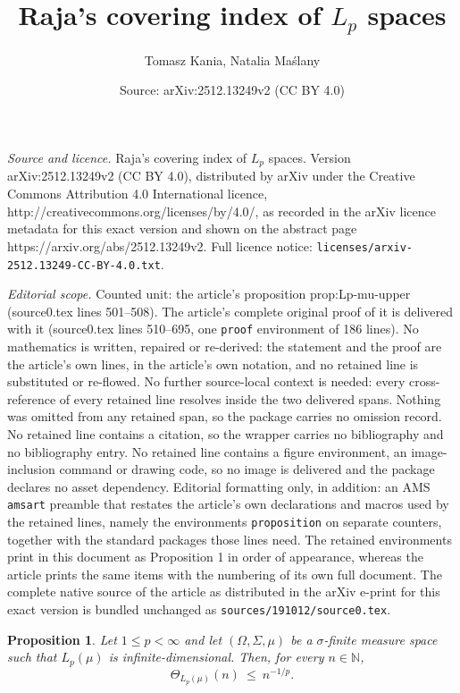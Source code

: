 \documentclass[10pt,a4paper]{amsart}
\title{Raja's covering index of $L_p$ spaces}
\author{Tomasz Kania, Natalia Ma\'slany}
\date{Source: arXiv:2512.13249v2 (CC BY 4.0)}
\newtheorem{proposition}{Proposition}
\renewcommand{\le}{\leqslant}
\begin{document}
\maketitle

\noindent\emph{Source and licence.} Raja's covering index of $L_p$ spaces. Version arXiv:2512.13249v2 (CC BY 4.0), distributed by arXiv under the Creative Commons Attribution 4.0 International licence, http://creativecommons.org/licenses/by/4.0/, as recorded in the arXiv licence metadata for this exact version and shown on the abstract page https://arxiv.org/abs/2512.13249v2. Full licence notice: \texttt{licenses/arxiv-2512.13249-CC-BY-4.0.txt}.\par\smallskip

\noindent\textit{Editorial scope.} Counted unit: the article's proposition prop:Lp-mu-upper (source0.tex lines 501--508). The article's complete original proof of it is delivered with it (source0.tex lines 510--695, one \texttt{proof} environment of 186 lines). No mathematics is written, repaired or re-derived: the statement and the proof are the article's own lines, in the article's own notation, and no retained line is substituted or re-flowed.  No further source-local context is needed: every cross-reference of every retained line resolves inside the two delivered spans.  Nothing was omitted from any retained span, so the package carries no omission record.  No retained line contains a citation, so the wrapper carries no bibliography and no bibliography entry.  No retained line contains a figure environment, an image-inclusion command or drawing code, so no image is delivered and the package declares no asset dependency.  Editorial formatting only, in addition: an AMS \texttt{amsart} preamble that restates the article's own declarations and macros used by the retained lines, namely the environments \texttt{proposition} on separate counters, together with the standard packages those lines need.  The retained environments print in this document as Proposition 1 in order of appearance, whereas the article prints the same items with the numbering of its own full document.  The complete native source of the article as distributed in the arXiv e-print for this exact version is bundled unchanged as \texttt{sources/191012/source0.tex}.
\begin{proposition}\label{prop:Lp-mu-upper}
Let $1\le p<\infty$ and let $(\Omega,\Sigma,\mu)$ be a $\sigma$-finite
measure space such that $L_p(\mu)$ is infinite-dimensional. Then, for every
$n\in\mathbb{N}$,
\[
\Theta_{L_p(\mu)}(n)\ \le\ n^{-1/p}.
\]
\end{proposition}
\end{document}
